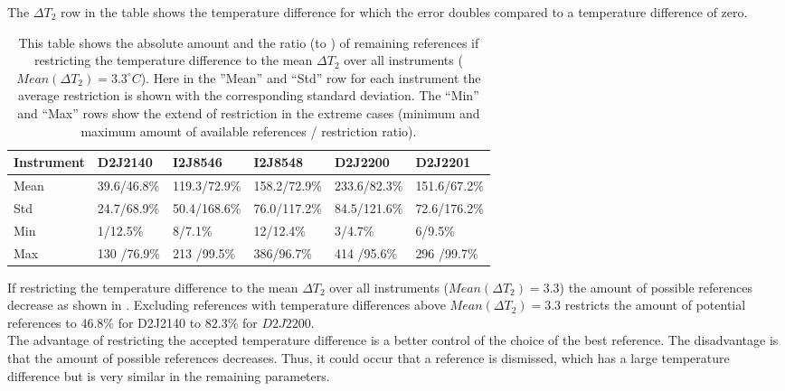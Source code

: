 The $\Delta T_{2}$ row in the table shows the temperature difference for which the error doubles compared to a temperature difference of zero.
\begin{table}
	\centering
	\begin{tabular}{|p{1.8cm}|p{2.15cm}|p{2.15cm}|p{2.15cm}|p{2.15cm}|p{2.15cm}|}
		Instrument	&D2J2140&I2J8546& I2J8548&D2J2200&D2J2201\\
		\toprule
		Mean&
		39.6/46.8\%&
		119.3/72.9\%
		&158.2/72.9\%
		&233.6/82.3\%
		&151.6/67.2\%\\
		\midrule
		Std&
		24.7/68.9\%&
		50.4/168.6\%&
		76.0/117.2\%&
		84.5/121.6\%&
		72.6/176.2\%\\
		\midrule
		Min&
		1/12.5\%
		&8/7.1\%&
		12/12.4\%&
		3/4.7\% &
		6/9.5\%\\
		\midrule
		Max
		&
		130	/76.9\%&
		213	/99.5\%&
		386/96.7\%&
		414	/95.6\% &
		296	/99.7\%\\
		\bottomrule
	\end{tabular}
	\caption{This table shows the absolute amount and the ratio (to ) of remaining references if restricting the temperature difference to the mean $\Delta T_{2}$ over all instruments ($Mean(\Delta T_{2}) = 3.3^{\circ}C$). Here in the ”Mean” and “Std” row for each  instrument the average restriction is shown with the corresponding standard deviation. The “Min” and “Max” rows show the extend of restriction in the extreme cases (minimum and maximum amount of available references / restriction ratio).}
	\label{tab:decTemp}
\end{table}	
If restricting the temperature difference to the mean $\Delta T_{2}$ over all instruments ($Mean(\Delta T_{2}) = 3.3$) the amount of possible references decrease as shown in . Excluding references with temperature differences above $Mean(\Delta T_{2}) = 3.3$ restricts the amount of potential references to $46.8\%$ for D2J2140 to $82.3\%$ for $D2J2200$.\\
The advantage of restricting the accepted temperature difference is a better control of the choice of the best reference. The disadvantage is that the amount of possible references decreases. Thus, it could occur that a reference is dismissed, which has a large temperature difference but is very similar in the remaining parameters.\\

